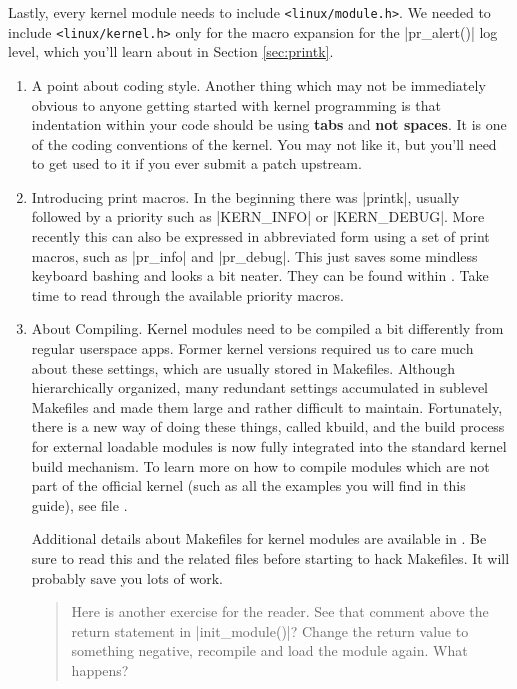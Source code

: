 \documentclass[10pt, oneside]{book}
\begin{document}
Lastly, every kernel module needs to include \verb|<linux/module.h>|.
We needed to include \verb|<linux/kernel.h>| only for the macro expansion for the \cpp|pr_alert()| log level, which you'll learn about in Section \ref{sec:printk}.

\begin{enumerate}
  \item A point about coding style.
        Another thing which may not be immediately obvious to anyone getting started with kernel programming is that indentation within your code should be using \textbf{tabs} and \textbf{not spaces}.
        It is one of the coding conventions of the kernel.
        You may not like it, but you'll need to get used to it if you ever submit a patch upstream.

  \item Introducing print macros.
  \label{sec:printk}
        In the beginning there was \cpp|printk|, usually followed by a priority such as \cpp|KERN_INFO| or \cpp|KERN_DEBUG|.
        More recently this can also be expressed in abbreviated form using a set of print macros, such as \cpp|pr_info| and \cpp|pr_debug|.
        This just saves some mindless keyboard bashing and looks a bit neater.
        They can be found within .
        Take time to read through the available priority macros.

  \item About Compiling.
        Kernel modules need to be compiled a bit differently from regular userspace apps.
        Former kernel versions required us to care much about these settings, which are usually stored in Makefiles.
        Although hierarchically organized, many redundant settings accumulated in sublevel Makefiles and made them large and rather difficult to maintain.
        Fortunately, there is a new way of doing these things, called kbuild, and the build process for external loadable modules is now fully integrated into the standard kernel build mechanism.
        To learn more on how to compile modules which are not part of the official kernel (such as all the examples you will find in this guide), see file .

        Additional details about Makefiles for kernel modules are available in . Be sure to read this and the related files before starting to hack Makefiles. It will probably save you lots of work.

\begin{quote}
Here is another exercise for the reader.
See that comment above the return statement in \cpp|init_module()|?
Change the return value to something negative, recompile and load the module again.
What happens?
\end{quote}
\end{enumerate}
\end{document}
